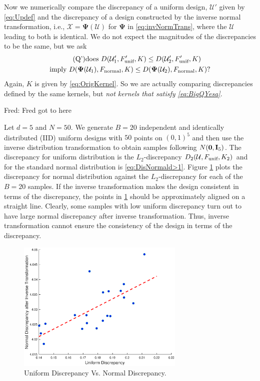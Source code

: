 \documentclass[graybox]{svmult}
\newcommand{\vPsi}{\boldsymbol{\Psi}}
\newcommand{\Udes}{\mathcal{U}}
\newcommand{\Xdes}{\mathcal{X}}
\newcommand{\unif}{\textup{unif}}
\newcommand{\normal}{\textup{normal}}
\newcommand{\FJH}[1]{{\color{blue}Fred: #1}}
\begin{document}
Now we numerically compare the discrepancy of a uniform design, $\Udes'$ given by \eqref{eq:Updef} and the discrepancy of a design constructed by the inverse normal transformation, i.e.,  $\Xdes = \vPsi(\Udes)$ for $\vPsi$ in \eqref{eq:invNormTrans}, where the $\Udes$ leading to both is identical.  We do not expect the magnitudes of the discrepancies to be the same, but we ask
\begin{multline} \tag{Q'}
    \text{does } D(\Udes'_1,F'_\unif, K)\leq D(\Udes_2',F_\unif', K) \\
    \text{imply }
     D(\vPsi(\Udes_1),F_\normal, K)\leq D(\vPsi(\Udes_2),F_\normal, K)?
\end{multline}
Again, $K$ is given by \eqref{eq:OrigKernel}.  So we are actually comparing discrepancies defined by the same kernels, but \emph{not kernels that satisfy \eqref{eq:BigQYesa}}.

\FJH{Fred got to here}

Let $d=5$ and $N=50$. 
We generate $B=20$ independent and identically distributed (IID) uniform designs with $50$ points on $(0,1)^5$ and then use the inverse distribution transformation to obtain samples following $N({\bf 0}, {\bf I}_5)$. 
The discrepancy for uniform distribution is the $L_2$-discrepancy $D_2(\Udes,F_\unif,K_2)$ and for the standard normal distribution is \eqref{eq:DisNormald>1}. 
Figure \ref{fig:UniVsNormDisc} plots the discrepancy for normal distribution against the $L_2$-discrepancy for each of the $B=20$ samples. 
If the inverse transformation makes the design consistent in terms of the discrepancy, the points in \ref{fig:UniVsNormDisc} should be approximately aligned on a straight line. 
Clearly, some samples with low uniform discrepancy turn out to have large normal discrepancy after inverse transformation.
Thus, inverse transformation cannot ensure the consistency of the design in terms of the discrepancy. 

\begin{figure}[ht]
\begin{center}
\includegraphics[width=8cm]{d5n50.eps}
\caption{Uniform Discrepancy Vs. Normal Discrepancy. \label{fig:UniVsNormDisc}}
\end{center}
\end{figure}
\end{document}
